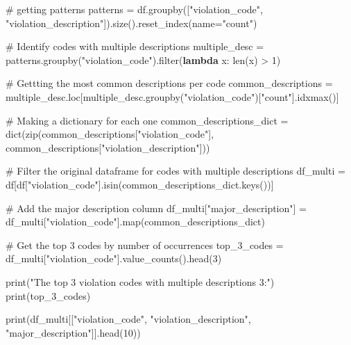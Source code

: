 \documentclass[
  letterpaper,
  DIV=11,
  numbers=noendperiod]{scrartcl}
\newenvironment{Shaded}{\begin{snugshade}}{\end{snugshade}}
\newcommand{\BuiltInTok}[1]{\textcolor[rgb]{0.00,0.23,0.31}{#1}}
\newcommand{\CommentTok}[1]{\textcolor[rgb]{0.37,0.37,0.37}{#1}}
\newcommand{\DecValTok}[1]{\textcolor[rgb]{0.68,0.00,0.00}{#1}}
\newcommand{\KeywordTok}[1]{\textcolor[rgb]{0.00,0.23,0.31}{\textbf{#1}}}
\newcommand{\NormalTok}[1]{\textcolor[rgb]{0.00,0.23,0.31}{#1}}
\newcommand{\OperatorTok}[1]{\textcolor[rgb]{0.37,0.37,0.37}{#1}}
\newcommand{\StringTok}[1]{\textcolor[rgb]{0.13,0.47,0.30}{#1}}
\begin{document}
\begin{Shaded}
\begin{Highlighting}[]
\CommentTok{\# getting patterns}
\NormalTok{patterns }\OperatorTok{=}\NormalTok{ df.groupby([}\StringTok{"violation\_code"}\NormalTok{, }\StringTok{"violation\_description"}\NormalTok{]).size().reset\_index(name}\OperatorTok{=}\StringTok{"count"}\NormalTok{)}

\CommentTok{\# Identify codes with multiple descriptions}
\NormalTok{multiple\_desc }\OperatorTok{=}\NormalTok{ patterns.groupby(}\StringTok{"violation\_code"}\NormalTok{).}\BuiltInTok{filter}\NormalTok{(}\KeywordTok{lambda}\NormalTok{ x: }\BuiltInTok{len}\NormalTok{(x) }\OperatorTok{\textgreater{}} \DecValTok{1}\NormalTok{)}

\CommentTok{\# Gettting the most common descriptions per code}
\NormalTok{common\_descriptions }\OperatorTok{=}\NormalTok{ multiple\_desc.loc[multiple\_desc.groupby(}\StringTok{"violation\_code"}\NormalTok{)[}\StringTok{"count"}\NormalTok{].idxmax()]}

\CommentTok{\# Making a dictionary for each one }
\NormalTok{common\_descriptions\_dict }\OperatorTok{=} \BuiltInTok{dict}\NormalTok{(}\BuiltInTok{zip}\NormalTok{(common\_descriptions[}\StringTok{"violation\_code"}\NormalTok{], common\_descriptions[}\StringTok{"violation\_description"}\NormalTok{]))}

\CommentTok{\# Filter the original dataframe for codes with multiple descriptions}
\NormalTok{df\_multi }\OperatorTok{=}\NormalTok{ df[df[}\StringTok{"violation\_code"}\NormalTok{].isin(common\_descriptions\_dict.keys())]}

\CommentTok{\# Add the major description column}
\NormalTok{df\_multi[}\StringTok{"major\_description"}\NormalTok{] }\OperatorTok{=}\NormalTok{ df\_multi[}\StringTok{"violation\_code"}\NormalTok{].}\BuiltInTok{map}\NormalTok{(common\_descriptions\_dict)}

\CommentTok{\# Get the top 3 codes by number of occurrences}
\NormalTok{top\_3\_codes }\OperatorTok{=}\NormalTok{ df\_multi[}\StringTok{"violation\_code"}\NormalTok{].value\_counts().head(}\DecValTok{3}\NormalTok{)}

\BuiltInTok{print}\NormalTok{(}\StringTok{"The top 3 violation codes with multiple descriptions 3:"}\NormalTok{)}
\BuiltInTok{print}\NormalTok{(top\_3\_codes)}

\BuiltInTok{print}\NormalTok{(df\_multi[[}\StringTok{"violation\_code"}\NormalTok{, }\StringTok{"violation\_description"}\NormalTok{, }\StringTok{"major\_description"}\NormalTok{]].head(}\DecValTok{10}\NormalTok{))}
\end{Highlighting}
\end{Shaded}
\end{document}
